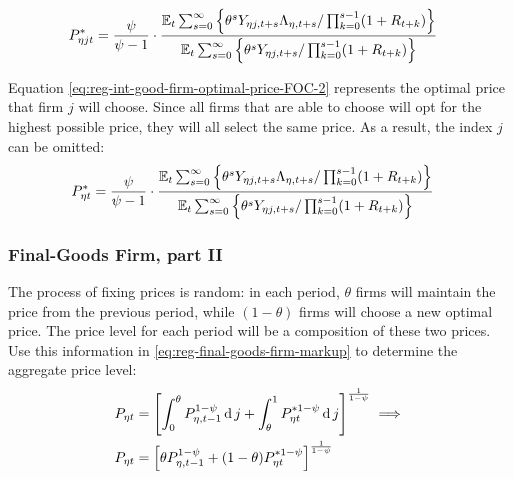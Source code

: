 \documentclass[
thesis.tex
]{subfiles}
\begin{document}
\vspace*{-1cm}

\begin{align}
	\label{eq:reg-int-good-firm-optimal-price-FOC-2}
	P_{\eta jt}^{\ast} &= 
	\frac{\psi}{\psi-1} \cdot
	\frac{
		{\mathbb{E}_{t}} \sum_{s=0}^{\infty} \left\{ 
		\theta^s Y_{\eta j,t+s} \Lambda_{\eta, t+s} / \prod_{k=0}^{s-1}(1+R_{t+k}) \right\}} {{\mathbb{E}_{t}} \sum_{s=0}^{\infty} \left\{
		\theta^s Y_{\eta j,t+s} / \prod_{k=0}^{s-1}(1+R_{t+k}) \right\}}
\end{align}


Equation \ref{eq:reg-int-good-firm-optimal-price-FOC-2} represents the optimal price that firm $j$ will choose. Since all firms that are able to choose will opt for the highest possible price, they will all select the same price. As a result, the index $j$ can be omitted:
\begin{align}
	\label{eq:reg-int-good-firm-optimal-price-FOC-3}
	P_{\eta t}^{\ast} &= 
	\frac{\psi}{\psi-1} \cdot
	\frac{
		{\mathbb{E}_{t}} \sum_{s=0}^{\infty} \left\{ 
		\theta^s Y_{\eta j,t+s} \Lambda_{\eta, t+s} / \prod_{k=0}^{s-1}(1+R_{t+k}) \right\}} {{\mathbb{E}_{t}} \sum_{s=0}^{\infty} \left\{
		\theta^s Y_{\eta j,t+s} / \prod_{k=0}^{s-1}(1+R_{t+k}) \right\}}
\end{align}


\subsubsection*{Final-Goods Firm, part II}

The process of fixing prices is random: in each period, $\theta$ firms will maintain the price from the previous period, while $(1-\theta)$ firms will choose a new optimal price. The price level for each period will be a composition of these two prices. Use this information in \ref{eq:reg-final-goods-firm-markup} to determine the aggregate price level:
\begin{align}
	P_{\eta t} & = \left[ \int_{0}^{\theta} P_{\eta, t-1}^{1-\psi} \operatorname{d} j + \int_{\theta}^{1} P_{\eta t}^{\ast 1-\psi} \operatorname{d} j \right]^{\frac{1}{1-\psi}}  \implies \nonumber \\
	P_{\eta t} & = \left[ \theta P_{\eta, t-1}^{1-\psi} + (1-\theta) P_{\eta t}^{\ast 1-\psi} \right]^\frac{1}{1-\psi} \label{eq:reg-general-price-level}
\end{align}
\end{document}
